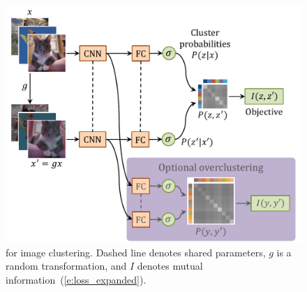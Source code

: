 \begin{figure}[t]
\centering
\includegraphics[width=0.95\columnwidth]{paper_imgs/overview1.pdf}
\caption{\label{f:overview}\methodnameshort for image clustering. Dashed line denotes shared parameters, $g$ is a random transformation, and $I$ denotes mutual information~(\cref{e:loss_expanded}).}
\end{figure}
